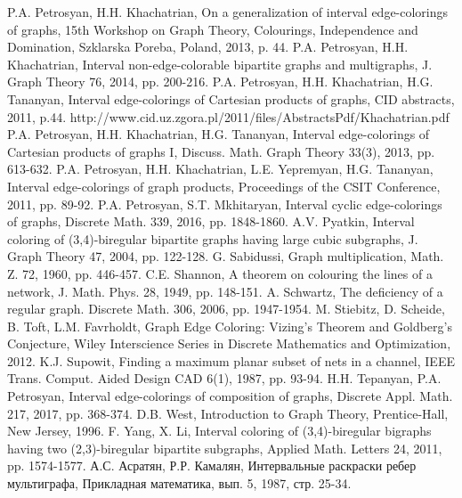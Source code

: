  P.A. Petrosyan, H.H. Khachatrian, On a generalization of interval edge-colorings of graphs, 15th Workshop on Graph Theory, Colourings, Independence and Domination, Szklarska Poreba, Poland, 2013, p. 44.
 P.A. Petrosyan, H.H. Khachatrian, Interval non-edge-colorable bipartite graphs and multigraphs, J. Graph Theory 76, 2014, pp. 200-216.
	P.A. Petrosyan, H.H. Khachatrian, H.G. Tananyan, Interval edge-colorings of Cartesian products of graphs, CID abstracts, 2011, p.44. http://www.cid.uz.zgora.pl/2011/files/AbstractsPdf/Khachatrian.pdf
	P.A. Petrosyan, H.H. Khachatrian, H.G. Tananyan, Interval edge-colorings of Cartesian products of graphs I, Discuss. Math. Graph Theory 33(3), 2013, pp. 613-632.
 P.A. Petrosyan, H.H. Khachatrian, L.E. Yepremyan, H.G. Tananyan, Interval edge-colorings of graph products, Proceedings of the CSIT Conference, 2011, pp. 89-92.
 P.A. Petrosyan, S.T. Mkhitaryan, Interval cyclic edge-colorings of graphs, Discrete Math. 339, 2016, pp. 1848-1860.
	A.V. Pyatkin, Interval coloring of (3,4)-biregular bipartite graphs having large cubic subgraphs, J. Graph Theory 47, 2004, pp. 122-128.
 G. Sabidussi, Graph multiplication, Math. Z. 72, 1960, pp. 446-457.
 C.E. Shannon, A theorem on colouring the lines of a network, J. Math. Phys. 28, 1949, pp. 148-151.
 A. Schwartz, The deficiency of a regular graph. Discrete Math. 306, 2006, pp. 1947-1954.
 M. Stiebitz, D. Scheide, B. Toft, L.M. Favrholdt, Graph Edge Coloring: Vizing's Theorem and Goldberg's Conjecture, Wiley Interscience Series in Discrete Mathematics and Optimization, 2012. 
 K.J. Supowit, Finding a maximum planar subset of nets in a channel, IEEE Trans. Comput. Aided Design CAD 6(1), 1987, pp. 93-94.
 H.H. Tepanyan, P.A. Petrosyan, Interval edge-colorings of composition of graphs, Discrete Appl. Math. 217, 2017, pp. 368-374.
	D.B. West, Introduction to Graph Theory, Prentice-Hall, New Jersey, 1996.
	F. Yang, X. Li, Interval coloring of (3,4)-biregular bigraphs having two (2,3)-biregular bipartite subgraphs, Applied Math. Letters 24, 2011, pp. 1574-1577. 
 А.С. Асратян, Р.Р. Камалян, Интервальные раскраски ребер мультиграфа, Прикладная математика, вып. 5, 1987, стр. 25-34.
